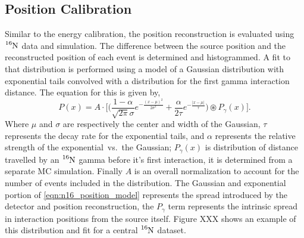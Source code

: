 \subsection{Position Calibration}
Similar to the energy calibration, the position reconstruction is evaluated
using $\ce{^{16}N}$ data and simulation.
The difference between the source position and the reconstructed
position of each event is determined and histogrammed.
A fit to that distribution is performed using a model of a Gaussian distribution
with exponential tails convolved with a distribution for the first gamma interaction
distance. The equation for this is given by,
\begin{equation}
    P(x)  = A \cdot \bigg[ \bigg(\frac{1 - \alpha}{\sqrt{2\pi}\sigma}e^{- \frac{(x-\mu)^2}{2\sigma^2}} + \frac{\alpha }{2 \tau}e^{-\frac{|x-\mu|}{\tau}}\bigg) \circledast P_{\gamma}(x) \bigg]\text{.}
    \label{eqn:n16_position_model}
\end{equation}
Where $\mu$ and $\sigma$ are respectively the center and width of the Gaussian,
$\tau$ represents the decay rate for the exponential tails, and $\alpha$ represents
the relative strength of the exponential~vs.~the Gaussian;
$P_{\gamma}(x)$ is distribution of distance travelled by an $\ce{^{16}N}$
gamma before it's first interaction, it is determined from a separate MC
simulation.
Finally $A$ is an overall normalization to account for the number of events
included in the distribution.
The Gaussian and exponential portion of
\eqref{eqn:n16_position_model} represents the spread introduced by the detector
and position reconstruction, the $P_\gamma$ term represents the intrinsic spread
in interaction positions from the source itself.
Figure XXX shows an example of this distribution and fit for a central $\ce{^{16}N}$
dataset.

